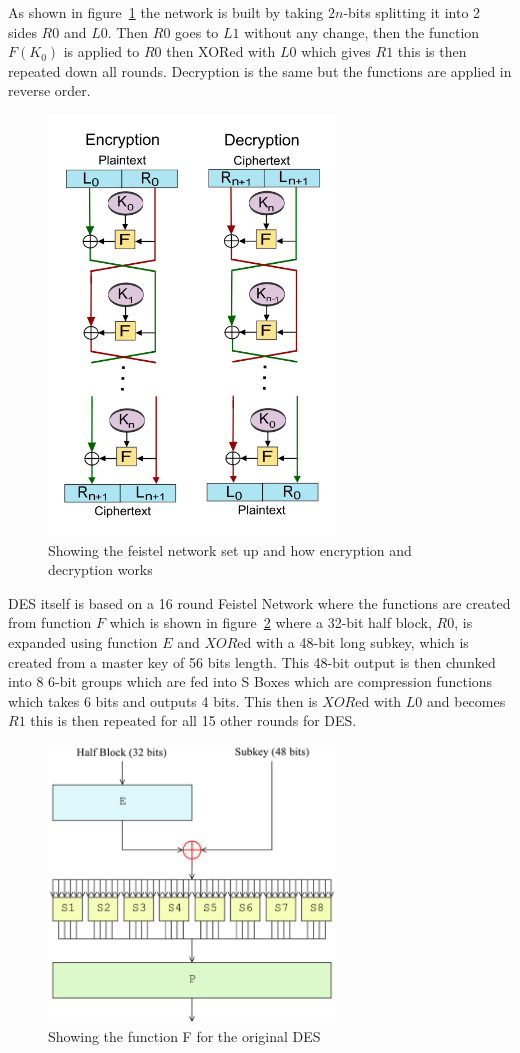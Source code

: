 \documentclass[12pt]{article}
\begin{document}
As shown in figure~\ref{fig:feistNetwork} the network is built by taking $2n$-bits splitting it into 2 sides $R0$ and $L0$. Then $R0$ goes to $L1$ without any change, then the function $F(K_0)$ is applied to $R0$ then XORed with $L0$ which gives $R1$ this is then repeated down all rounds. Decryption is the same but the functions are applied in reverse order.

\begin{figure}
    \center
    \includegraphics[width=3in]{feistNetwork.png}
    \caption{Showing the feistel network set up and how encryption and decryption works}
    \label{fig:feistNetwork}
\end{figure}

DES itself is based on a 16 round Feistel Network where the functions are created from function $F$ which is shown in figure~\ref{fig:functionF} where a 32-bit half block, $R0$, is expanded using function $E$ and $XOR$ed with a 48-bit long subkey, which is created from a master key of 56 bits length. This 48-bit output is then chunked into 8 6-bit groups which are fed into S Boxes which are compression functions which takes 6 bits and outputs 4 bits. This then is $XOR$ed with $L0$ and becomes $R1$ this is then repeated for all 15 other rounds for DES.

\begin{figure}
    \center
    \includegraphics[width=3in]{functionF.png}
    \caption{Showing the function F for the original DES}
    \label{fig:functionF}
\end{figure}
\end{document}
